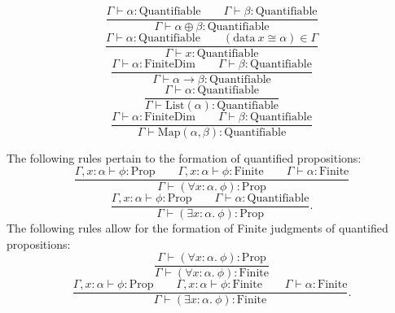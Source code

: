 \documentclass[11pt]{article}
\begin{document}
\begin{equation}
	\frac{\Gamma \vdash \alpha : \text{Quantifiable}
	\qquad \Gamma \vdash \beta : \text{Quantifiable}}
	{\Gamma \vdash \alpha \oplus \beta : \text{Quantifiable}}
\end{equation}
\begin{equation}
	\frac{\Gamma \vdash \alpha : \text{Quantifiable}
	\qquad (\text{data}\ x \cong \alpha) \in \Gamma}
	{\Gamma \vdash x : \text{Quantifiable}}
\end{equation}
\begin{equation}
	\frac{\Gamma \vdash \alpha : \text{FiniteDim}
	\qquad \Gamma \vdash \beta : \text{Quantifiable}}
	{\Gamma \vdash \alpha \to \beta : \text{Quantifiable}}
\end{equation}
\begin{equation}
	\frac{\Gamma \vdash \alpha : \text{Quantifiable}}
	{\Gamma \vdash \text{List}(\alpha) : \text{Quantifiable}}
\end{equation}
\begin{equation}
	\label{eq:quantifiable-last}
	\frac{\Gamma \vdash \alpha : \text{FiniteDim}
	\qquad \Gamma \vdash \beta : \text{Quantifiable}}
	{\Gamma \vdash \text{Map}(\alpha, \beta) : \text{Quantifiable}}
\end{equation}

The following rules pertain to the formation of quantified
propositions:
\begin{equation}
	\frac{\Gamma, x : \alpha \vdash \phi : \text{Prop}
	\qquad \Gamma, x : \alpha \vdash \phi : \text{Finite}
	\qquad \Gamma \vdash \alpha : \text{Finite}}
	{\Gamma \vdash (\forall x : \alpha.\ \phi) : \text{Prop}}
\end{equation}
\begin{equation}
	\frac{\Gamma, x : \alpha \vdash \phi : \text{Prop}
	\qquad \Gamma \vdash \alpha : \text{Quantifiable}}
	{\Gamma \vdash (\exists x : \alpha.\ \phi) : \text{Prop}}.
\end{equation}
The following rules allow for the formation of Finite judgments
of quantified propositions:
\begin{equation}
	\frac{\Gamma \vdash (\forall x : \alpha.\ \phi) : \text{Prop}}
	{\Gamma \vdash (\forall x : \alpha.\ \phi) : \text{Finite}}
\end{equation}
\begin{equation}
	\frac{\Gamma, x : \alpha \vdash \phi : \text{Prop}
	\qquad \Gamma, x : \alpha \vdash \phi : \text{Finite}
	\qquad \Gamma \vdash \alpha : \text{Finite}}
	{\Gamma \vdash (\exists x : \alpha.\ \phi) : \text{Finite}}.
\end{equation}
\end{document}
